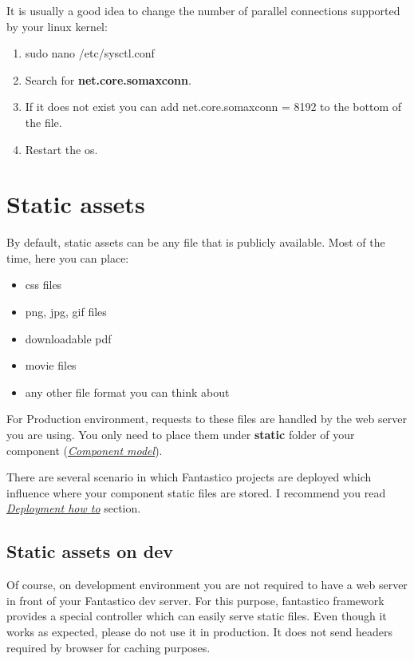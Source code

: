 \documentclass[letterpaper,10pt,english]{sphinxmanual}
\begin{document}
It is usually a good idea to change the number of parallel connections supported by your linux kernel:
\begin{enumerate}
\item {} 
sudo nano /etc/sysctl.conf

\item {} 
Search for \textbf{net.core.somaxconn}.

\item {} 
If it does not exist you can add net.core.somaxconn = 8192 to the bottom of the file.

\item {} 
Restart the os.

\end{enumerate}


\section{Static assets}
\label{how_to/static_assets:static-assets}\label{how_to/static_assets::doc}
By default, static assets can be any file that is publicly available. Most of the time, here you can place:
\begin{itemize}
\item {} 
css files

\item {} 
png, jpg, gif files

\item {} 
downloadable pdf

\item {} 
movie files

\item {} 
any other file format you can think about

\end{itemize}

For Production environment, requests to these files are handled by the web server you are using. You only need to
place them under \textbf{static} folder of your component ({\hyperref[features/component_model::doc]{\emph{Component model}}}).

There are several scenario in which Fantastico projects are deployed which influence where your component static files
are stored. I recommend you read {\hyperref[how_to/deployment_how_to::doc]{\emph{Deployment how to}}} section.


\subsection{Static assets on dev}
\label{how_to/static_assets:static-assets-on-dev}
Of course, on development environment you are not required to have a web server in front of your Fantastico dev server.
For this purpose, fantastico framework provides a special controller which can easily serve static files. Even though
it works as expected, please do not use it in production. It does not send headers required by browser for caching
purposes.
\end{document}
